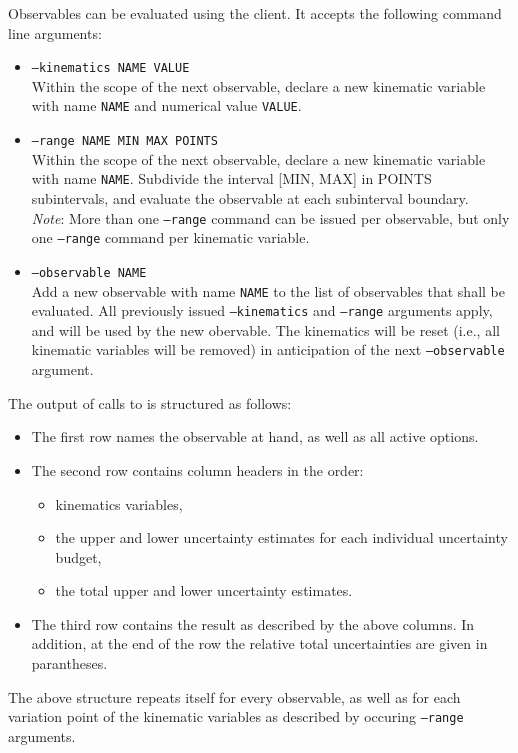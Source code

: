 Observables can be evaluated using the  client. It accepts
the following command line arguments:
\begin{itemize}
    \item[] \texttt{--kinematics NAME VALUE}\\[\medskipamount]
        Within the scope of the next observable, declare a new kinematic
        variable with name \texttt{NAME} and numerical value \texttt{VALUE}.

    \item[] \texttt{--range NAME MIN MAX POINTS}\\[\medskipamount]
        Within the scope of the next observable, declare a new kinematic
        variable with name \texttt{NAME}. Subdivide the interval [MIN, MAX]
        in POINTS subintervals, and evaluate the observable at each subinterval
        boundary.\\

        \emph{Note}: More than one \texttt{--range} command can be issued per
        observable, but only one \texttt{--range} command per kinematic variable.

    \item[] \texttt{--observable NAME}\\[\medskipamount]
        Add a new observable with name \texttt{NAME} to the list of observables
        that shall be evaluated. All previously issued \texttt{--kinematics}
        and \texttt{--range} arguments apply, and will be used by the new obervable.
        The kinematics will be reset (i.e., all kinematic variables will be removed)
        in anticipation of the next \texttt{--observable} argument.
\end{itemize}
The output of calls to  is structured as follows:
\begin{itemize}
    \item The first row names the observable at hand, as well as all active options.
    \item The second row contains column headers in the order:
        \begin{itemize}
            \item kinematics variables,
            \item the upper and lower uncertainty estimates for each individual uncertainty budget,
            \item the total upper and lower uncertainty estimates.
        \end{itemize}
    \item The third row contains the result as described by the above columns. In addition, at
        the end of the row the relative total uncertainties are given in parantheses.
\end{itemize}
The above structure repeats itself for every observable, as well as for each variation point
of the kinematic variables as described by occuring \texttt{--range} arguments.\\

